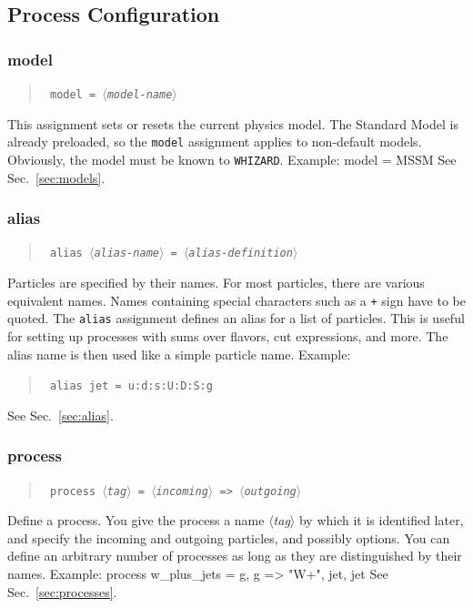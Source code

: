 \documentclass[12pt]{book}
\newenvironment{code}%
  {\begingroup\footnotesize
   \quote
   \verbatim}%
  {\endverbatim
   \endquote
   \endgroup\noindent}
\newenvironment{syntax}%
  {\begin{quote}
   \begin{flushleft}\tt}%
  {\end{flushleft}
   \end{quote}}
\newcommand{\var}[1]{$\langle$\textit{#1}$\rangle$}
\newcommand{\ttt}[1]{\texttt{#1}}
\newcommand{\whizard}{\texttt{WHIZARD}}
\begin{document}
\subsection{Process Configuration}

\subsubsection{model}
\begin{syntax}
model = \var{model-name}
\end{syntax}
This assignment sets or resets the current physics model.  The
Standard Model is already preloaded, so the \ttt{model} assignment
applies to non-default models.  Obviously, the model must be known to
\whizard. Example:
\begin{code}
model = MSSM
\end{code}
See Sec.~\ref{sec:models}.

\subsubsection{alias}
\begin{syntax}
alias \var{alias-name} = \var{alias-definition}
\end{syntax}
Particles are specified by their names.   For most particles, there
are various equivalent names.  Names containing special characters
such as a \verb|+| sign have to be quoted.  The \ttt{alias} assignment
defines an alias for a list of particles.  This is useful for setting
up processes with sums over flavors, cut expressions, and more.  The
alias name is then used like a simple particle name.  Example:
\begin{syntax}
alias jet = u:d:s:U:D:S:g
\end{syntax}
See Sec.~\ref{sec:alias}.


\subsubsection{process}
\begin{syntax}
process \var{tag} = \var{incoming} \verb|=>| \var{outgoing}
\end{syntax}
Define a process.  You give the process a name \var{tag} by which it is
identified later, and specify the incoming and outgoing particles,
and possibly options.  You can define an arbitrary number of processes
as long as they are distinguished by their names.  Example:
\begin{code}
process w_plus_jets = g, g => "W+", jet, jet
\end{code}
See Sec.~\ref{sec:processes}.
\end{document}
